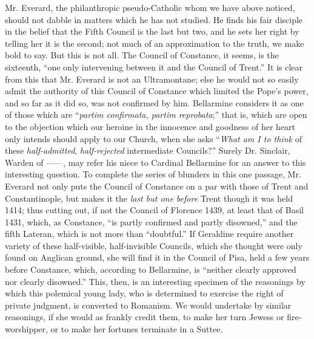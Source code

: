 Mr. Everard, the philanthropic pseudo-Catholic whom
we have above noticed, should not dabble in matters which he has not
studied. He finds his fair disciple in the belief that the Fifth Council
is the last but two, and he sets her right by telling her it is the
second; not much of an approximation to the truth, we make bold to say.
But this is not all. The Council of Constance, it seems, is the
sixteenth, ``one only intervening between it and the Council of Trent.''
It is clear from this that Mr. Everard is not an Ultramontane; else he
would not so easily admit the authority of this Council of Constance
which limited the Pope's power, and so far as it did so, was not
confirmed by him. Bellarmine considers it as one of those which are ``\emph{partim
confirmata, partim reprobata};'' that is, which are open to the
objection which our heroine in the innocence and goodness of her heart
only intends should apply to our Church, when she asks ``\emph{What am I to
think} of these \emph{half-admitted}, \emph{half-rejected}
intermediate Councils?'' Surely Dr. Sinclair, Warden of ——, may refer
his niece to Cardinal Bellarmine for an answer to this interesting
question. To complete the series of blunders in this one passage, Mr.
Everard not only puts the Council of Constance on a par with those of
Trent and Constantinople, but makes it the \emph{last but one before}
Trent though it was held 1414; thus cutting out, if not the Council of
Florence 1439, at least that of Basil 1431, which, as Constance, ``is
partly confirmed and partly disowned,'' and the fifth Lateran, which is
not more than ``doubtful.'' If Geraldine require another variety of these
half-visible, half-invisible Councils, which she thought were only found
on Anglican ground, she will find it in the Council of Pisa, held a few
years before Constance, which, according to Bellarmine, is ``neither
clearly approved nor clearly disowned.'' This, then, is an interesting
specimen of the reasonings by which this polemical young lady, who is
determined to exercise the right of private judgment, is converted to
Romanism. We would undertake by similar reasonings, if she would as
frankly credit them, to make her turn Jewess or fire-worshipper, or to
make her fortunes terminate in a Suttee.

